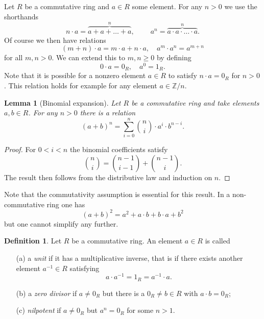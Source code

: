 \documentclass [12pt,oneside,a4paper,mathscr]{amsart}
\newtheorem{lemma}[thm]{Lemma}
\theoremstyle{definition}
\newtheorem{defn}[thm]{Definition}
\renewcommand{\geq}{\geqslant}
\newcommand{\Z}{\mathbb Z}
\begin{document}






Let $R$ be a commutative ring and $a\in R$ some element. For any $n>0$ we use the shorthands
\[n\cdot a = \overbrace{a+a+\dots+a}^{n \text{}}, \qquad \ a^n = \overbrace{a\cdot a\cdot \dots\cdot a}^{n \text{}} .\]
Of course we then have relations
\[(m+n)\cdot a = m\cdot a + n\cdot a, \quad a^{m}\cdot a^n=a^{m+n}\]
for all $m,n> 0$. We can extend this to $m,n\geq 0$ by defining
\[0\cdot a =0_R, \quad a^0=1_R.\]
 Note  that it is possible for a nonzero element $a\in R$ to satisfy  $n\cdot a=0_R$ for $n>0$. This relation holds for example for any element $a\in \Z/n$. 



\begin{lemma}[Binomial expansion]
Let $R$ be a commutative ring and take elements  $a,b\in R$. For any $n>0$ there is a relation
\[(a+b)^n = \sum_{i=0}^n {n\choose i}\cdot  a^i \cdot b^{n-i}.\]
\end{lemma}

\begin{proof}
For $0<i<n$ the binomial coefficients satisfy
\[{n \choose i} = {{n-1} \choose {i-1}} +{ {n-1} \choose i}.\]
The result then follows from the distributive law and induction on $n$.
\end{proof} 

Note that the commutativity assumption is essential for this result. In a non-commutative ring one has
\[(a+b)^2 = a^2 + a\cdot b + b\cdot a + b^2\]
but one cannot simplify any further.

\begin{defn}
Let $R$ be a commutative ring. An element $a\in R$ is called
\begin{itemize}
\item[(a)]
 a \emph{unit} if it has a multiplicative inverse, that is if there exists another element $a^{-1}\in R$ satisfying
\[ a \cdot a^{-1}=1_R = a^{-1}\cdot a.\]

\item[(b)] a \emph{zero divisor} if $a\neq 0_R$ but there is a  $0_R\neq b\in R$ with $a\cdot b = 0_R$;\smallskip
\item[(c)] \emph{nilpotent} if $a\neq 0_R$ but $a^n=0_R$ for some $n>1$.
\end{itemize}
\end{defn}
\end{document}
